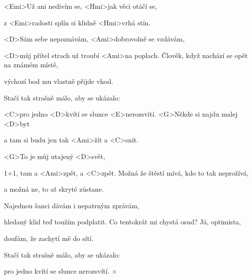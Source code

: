 
\zs
<Emi>Už ani nedivím se, <Hmi>jak věci otáčí se,

z <Emi>radosti splín si klidně <Hmi>vrhá stín.

<D>Sám sebe nepoznávám, <Ami>dobrovolně se vzdávám,

<D>můj přítel strach už troubí <Ami>na poplach.
\ks
\zs
Člověk, když nachází se opět na známém místě,

výchozí bod mu vlastně přijde vhod.

Stačí tak strašně málo, aby se ukázalo:

<C>pro jedno <D>kvítí se slunce <E>nerozsvítí.
\ks
\zr
<G>Někde si najdu malej <D>byt

a tam si budu jen tak <Ami>žít a <C>snít.

<G>To je můj utajený <D>svět,

1+1, tam a <Ami>zpět, a <C>zpět.
\kr
\zs
Možná že štěstí mívá, kdo to tak neprožívá,

a možná ne, to ať skryté zůstane.

Najednou šanci dávám i nepatrným zprávám,

hledaný klid teď toužím podplatit.
\ks
\zs
Co tentokrát mi chystá osud? Já, optimista,

doufám, že zachytí mě do sítí.

Stačí tak strašně málo, aby se ukázalo:

pro jedno kvítí se slunce nerozsvítí.
\ks
{}×
\kr
\kp

